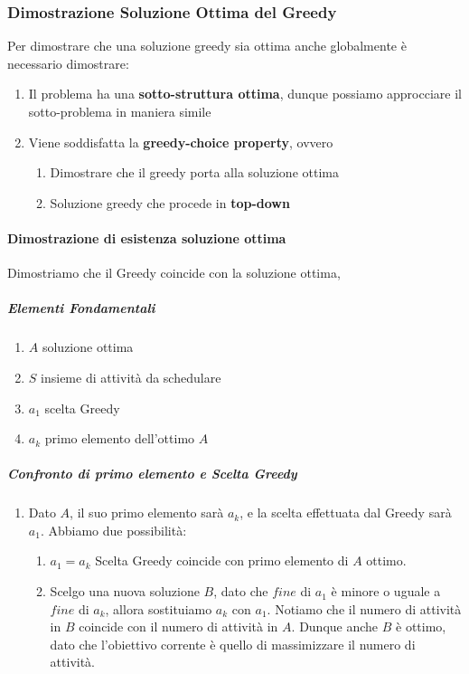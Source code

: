 \documentclass{article}
\begin{document}
\subsubsection{Dimostrazione Soluzione Ottima del Greedy} Per dimostrare che una soluzione greedy sia ottima anche globalmente è necessario dimostrare:

\begin{enumerate}
    \item Il problema ha una \textbf{sotto-struttura ottima}, dunque possiamo approcciare il sotto-problema in maniera simile
    \item Viene soddisfatta la \textbf{greedy-choice property}, ovvero
    \begin{enumerate}
        \item Dimostrare che il greedy porta alla soluzione ottima
        \item Soluzione greedy che procede in \textbf{top-down}
    \end{enumerate}
\end{enumerate}

\paragraph{Dimostrazione di esistenza soluzione ottima} Dimostriamo che il Greedy coincide con la soluzione ottima, 
\subparagraph{Elementi Fondamentali}
\begin{enumerate}
    \item $A$ soluzione ottima
    \item $S$ insieme di attività da schedulare
    \item $a_{1}$ scelta Greedy
    \item $a_{k}$ primo elemento dell'ottimo $A$
\end{enumerate}

\subparagraph{Confronto di primo elemento e Scelta Greedy}

\begin{enumerate}
    \item Dato $A$, il suo primo elemento sarà $a_k$, e la scelta effettuata dal Greedy sarà $a_{1}$. Abbiamo due possibilità:
    \begin{enumerate}
        \item $a_{1} = a_{k}$ Scelta Greedy coincide con primo elemento di $A$ ottimo.
        \item Scelgo una nuova soluzione $B$, dato che $fine$ di $a_{1}$ è minore o uguale a $fine$ di $a_{k}$, allora sostituiamo $a_{k}$ con $a_{1}$. Notiamo che il numero di attività in $B$ coincide con il numero di attività in $A$. Dunque anche $B$ è ottimo, dato che l'obiettivo corrente è quello di massimizzare il numero di attività.
    \end{enumerate}
\end{enumerate}
\end{document}
